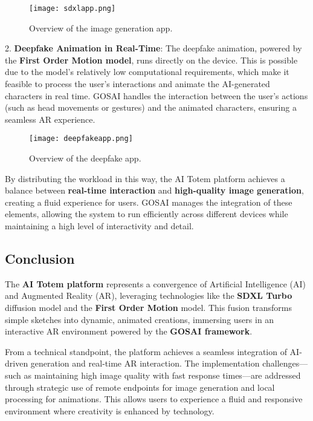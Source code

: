 \begin{figure}[h]
    \centering
    \texttt{[image: sdxlapp.png]}
    \caption{Overview of the image generation app.}
    \vspace{0.1cm}
    \label{fig:imgenapp}
\end{figure}

2.  \textbf{Deepfake Animation in Real-Time}: The deepfake animation, powered by the \textbf{First Order Motion model}, runs directly on the device.
This is possible due to the model's relatively low computational requirements, which make it feasible to process the user's interactions and animate the AI-generated characters in real time.
GOSAI handles the interaction between the user's actions (such as head movements or gestures) and the animated characters, ensuring a seamless AR experience.

\begin{figure}[h]
    \centering
    \texttt{[image: deepfakeapp.png]}
    \caption{Overview of the deepfake app.}
    \vspace{0.1cm}
    \label{fig:deepfakeapp}
\end{figure}
    

By distributing the workload in this way, the AI Totem platform achieves a balance between \textbf{real-time interaction} and \textbf{high-quality image generation}, creating a fluid experience for users.
GOSAI manages the integration of these elements, allowing the system to run efficiently across different devices while maintaining a high level of interactivity and detail.



\subsection{Conclusion}

The \textbf{AI Totem platform} represents a convergence of Artificial Intelligence (AI) and Augmented Reality (AR), leveraging technologies like the \textbf{SDXL Turbo} diffusion model and the \textbf{First Order Motion} model.
This fusion transforms simple sketches into dynamic, animated creations, immersing users in an interactive AR environment powered by the \textbf{GOSAI framework}.

From a technical standpoint, the platform achieves a seamless integration of AI-driven generation and real-time AR interaction.
The implementation challenges—such as maintaining high image quality with fast response times—are addressed through strategic use of remote endpoints for image generation and local processing for animations.
This allows users to experience a fluid and responsive environment where creativity is enhanced by technology.

